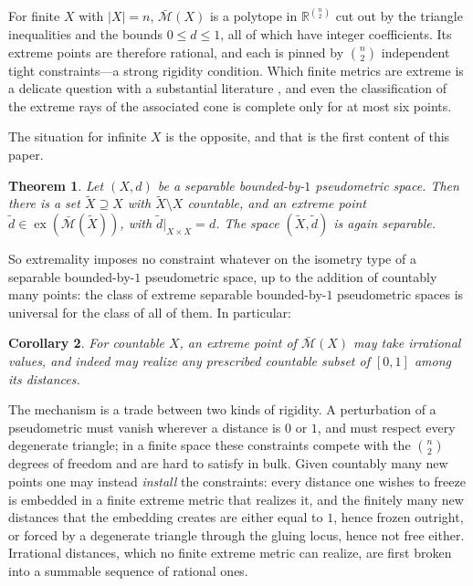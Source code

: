 \documentclass[11pt]{article}
\newtheorem{theorem}{Theorem}[section]
\newtheorem{corollary}[theorem]{Corollary}
\theoremstyle{definition}
\theoremstyle{remark}
\newcommand{\R}{\mathbb{R}}
\newcommand{\bM}{\bar{\mathcal{M}}}
\newcommand{\ex}{\operatorname{ex}}
\begin{document}
For finite $X$ with $|X|=n$, $\bM(X)$ is a polytope in $\R^{\binom{n}{2}}$ cut out by the
triangle inequalities and the bounds $0\le d\le 1$, all of which have integer coefficients.
Its extreme points are therefore rational, and each is pinned by $\binom{n}{2}$
independent tight constraints---a strong rigidity condition. Which finite metrics are
extreme is a delicate question with a substantial literature
\cite{Avis80,Bandelt92,Deza97,Koolen00}, and even the classification of the extreme rays of the
associated cone is complete only for at most six points.

The situation for infinite $X$ is the opposite, and that is the first content of this
paper.

\begin{theorem}\label{thm:main}
Let $(X,d)$ be a separable bounded-by-$1$ pseudometric space. Then there is a set
$\tilde X\supseteq X$ with $\tilde X\setminus X$ countable, and an extreme point
$\tilde d\in\ex(\bM(\tilde X))$, with $\tilde d|_{X\times X}=d$. The space
$(\tilde X,\tilde d)$ is again separable.
\end{theorem}

So extremality imposes no constraint whatever on the isometry type of a separable
bounded-by-$1$ pseudometric space, up to the addition of countably many points: the class
of extreme separable bounded-by-$1$ pseudometric spaces is universal for the class of all
of them. In particular:

\begin{corollary}\label{cor:irrational}
For countable $X$, an extreme point of $\bM(X)$ may take irrational values, and indeed may
realize any prescribed countable subset of $[0,1]$ among its distances.
\end{corollary}

The mechanism is a trade between two kinds of rigidity. A perturbation of a pseudometric
must vanish wherever a distance is $0$ or $1$, and must respect every degenerate triangle;
in a finite space these constraints compete with the $\binom{n}{2}$ degrees of freedom and
are hard to satisfy in bulk. Given countably many new points one may instead \emph{install}
the constraints: every distance one wishes to freeze is embedded in a finite extreme
metric that realizes it, and the finitely many new distances that the embedding creates are
either equal to $1$, hence frozen outright, or forced by a degenerate triangle through the
gluing locus, hence not free either. Irrational distances, which no finite extreme metric
can realize, are first broken into a summable sequence of rational ones.
\end{document}
